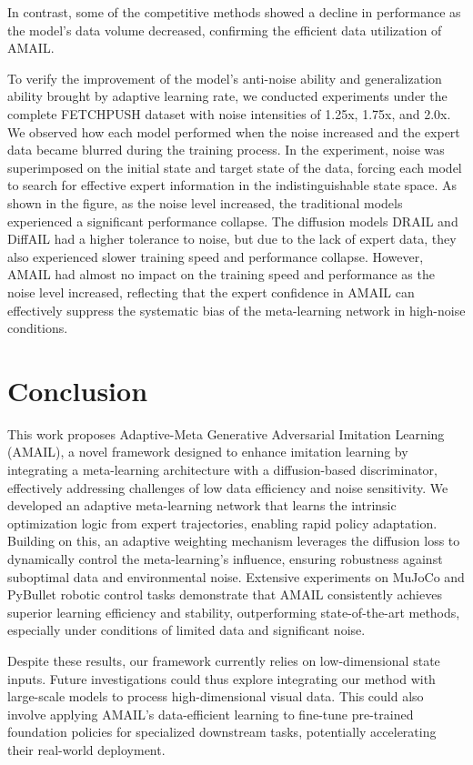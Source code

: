 \documentclass[lettersize,journal]{IEEEtran}
\begin{document}
In contrast, some of the competitive methods showed a decline in performance as the model's data volume decreased, confirming the efficient data utilization of AMAIL.

To verify the improvement of the model's anti-noise ability and generalization ability brought by adaptive learning rate, we conducted experiments under the complete FETCHPUSH dataset with noise intensities of 1.25x, 1.75x, and 2.0x. We observed how each model performed when the noise increased and the expert data became blurred during the training process. In the experiment, noise was superimposed on the initial state and target state of the data, forcing each model to search for effective expert information in the indistinguishable state space. As shown in the figure, as the noise level increased, the traditional models experienced a significant performance collapse. The diffusion models DRAIL and DiffAIL had a higher tolerance to noise, but due to the lack of expert data, they also experienced slower training speed and performance collapse. However, AMAIL had almost no impact on the training speed and performance as the noise level increased, reflecting that the expert confidence in AMAIL can effectively suppress the systematic bias of the meta-learning network in high-noise conditions.



\section{Conclusion}
This work proposes Adaptive-Meta Generative Adversarial Imitation Learning (AMAIL), a novel framework designed to enhance imitation learning by integrating a meta-learning architecture with a diffusion-based discriminator, effectively addressing challenges of low data efficiency and noise sensitivity. We developed an adaptive meta-learning network that learns the intrinsic optimization logic from expert trajectories, enabling rapid policy adaptation. Building on this, an adaptive weighting mechanism leverages the diffusion loss to dynamically control the meta-learning's influence, ensuring robustness against suboptimal data and environmental noise. Extensive experiments on MuJoCo and PyBullet robotic control tasks demonstrate that AMAIL consistently achieves superior learning efficiency and stability, outperforming state-of-the-art methods, especially under conditions of limited data and significant noise.

Despite these results, our framework currently relies on low-dimensional state inputs. Future investigations could thus explore integrating our method with large-scale models to process high-dimensional visual data. This could also involve applying AMAIL's data-efficient learning to fine-tune pre-trained foundation policies for specialized downstream tasks, potentially accelerating their real-world deployment.
\end{document}
